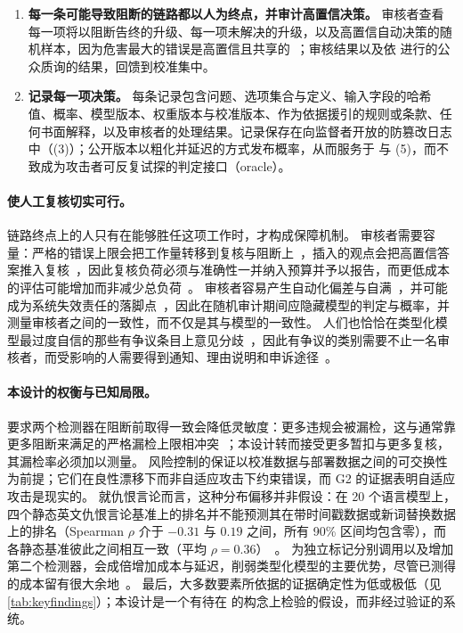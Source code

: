 \begin{enumerate}
  \item \textbf{每一条可能导致阻断的链路都以人为终点，并审计高置信决策。} 审核者查看每一项将以阻断告终的升级、每一项未解决的升级，以及高置信自动决策的随机样本，因为危害最大的错误是高置信且共享的~\cite{arx29769,arx33401}；审核结果以及依  进行的公众质询的结果，回馈到校准集中。
  \item \textbf{记录每一项决策。} 每条记录包含问题、选项集合与定义、输入字段的哈希值、概率、模型版本、权重版本与校准版本、作为依据援引的规则或条款、任何书面解释，以及审核者的处理结果。记录保存在向监督者开放的防篡改日志中（(3)）；公开版本以粗化并延迟的方式发布概率，从而服务于  与 (5)，而不致成为攻击者可反复试探的判定接口（oracle）。
\end{enumerate}

\paragraph{使人工复核切实可行。}
链路终点上的人只有在能够胜任这项工作时，才构成保障机制。
审核者需要容量：严格的错误上限会把工作量转移到复核与阻断上~\cite{arx33401}，插入的观点会把高置信答案推入复核~\cite{arx31142}，因此复核负荷必须与准确性一并纳入预算并予以报告，而更低成本的评估可能增加而非减少总负荷~\cite{arx01231}。
审核者容易产生自动化偏差与自满~\cite{parasuraman2010complacency,green2022flaws}，并可能成为系统失效责任的落脚点~\cite{elish2019moral}，因此在随机审计期间应隐藏模型的判定与概率，并测量审核者之间的一致性，而不仅是其与模型的一致性。
人们也恰恰在类型化模型最过度自信的那些有争议条目上意见分歧~\cite{pavlick2019inherent,davani2022dealing,zen23032384}\zmark{}，因此有争议的类别需要不止一名审核者，而受影响的人需要得到通知、理由说明和申诉途径~\cite{santaclara2021,dsa2022}。

\paragraph{本设计的权衡与已知局限。}
要求两个检测器在阻断前取得一致会降低灵敏度：更多违规会被漏检，这与通常靠更多阻断来满足的严格漏检上限相冲突~\cite{arx33401}；本设计转而接受更多暂扣与更多复核，其漏检率必须加以测量。
风险控制的保证以校准数据与部署数据之间的可交换性为前提；它们在良性漂移下而非自适应攻击下约束错误，而 G2 的证据表明自适应攻击是现实的。
就仇恨言论而言，这种分布偏移并非假设：在 20 个语言模型上，四个静态英文仇恨言论基准上的排名并不能预测其在带时间戳数据或新词替换数据上的排名（Spearman $\rho$ 介于 $-0.31$ 与 $0.19$ 之间，所有 90\% 区间均包含零），而各静态基准彼此之间相互一致（平均 $\rho = 0.36$）~\cite{dibonaventura2025hatevolution}。
为独立标记分别调用以及增加第二个检测器，会成倍增加成本与延迟，削弱类型化模型的主要优势，尽管已测得的成本留有很大余地~\cite{arx00346,arx01079}。
最后，大多数要素所依据的证据确定性为低或极低（见\cref{tab:keyfindings}）；本设计是一个有待在 \pol{} 的构念上检验的假设，而非经过验证的系统。

